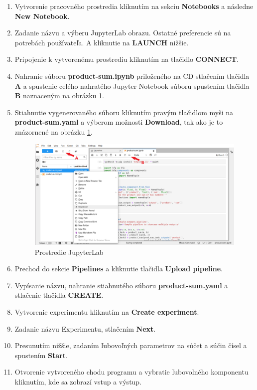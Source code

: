 \begin{enumerate}
\item Vytvorenie pracovného prostredia kliknutím na sekciu \textbf{Notebooks} a následne \textbf{New Notebook}.
\item Zadanie názvu a výberu JupyterLab obrazu. Ostatné preferencie sú na potrebách používateľa. A kliknutie na \textbf{LAUNCH} nižšie.
\item Pripojenie k vytvorenému prostrediu kliknutím na tlačidlo \textbf{CONNECT}.
\item Nahranie súboru \textbf{product-sum.ipynb} priloženého na CD stlačením tlačidla \textbf{A} a spustenie celého nahratého Jupyter Notebook súboru spustením tlačidla \textbf{B} naznaceným na obrázku \ref{tu}.
\item {Stiahnutie vygenerovaného súboru kliknutím pravým tlačidlom myši na \textbf{product-sum.yaml} a výberom možnosti \textbf{Download}, tak ako je to znázornené na obrázku \ref{tu}.
\begin{figure}[!h]
    \centering
    \includegraphics[width=1\linewidth]{figures/4.png}
    \caption{Prostredie JupyterLab}
    \label{tu}
\end{figure}}
\item Prechod do sekcie \textbf{Pipelines} a kliknutie tlačidla \textbf{Upload pipeline}.
\item Vypísanie názvu, nahranie stiahnutého súboru \textbf{product-sum.yaml} a stlačenie tlačidla \textbf{CREATE}.
\item Vytvorenie experimentu kliknutím na \textbf{Create experiment}.
\item Zadanie názvu Experimentu, stlačením \textbf{Next}.
\item Presunutím nižšie, zadaním ľubovoľných parametrov na súčet a súčin čísel a spustením \textbf{Start}.
\item Otvorenie vytvoreného chodu programu a vybratie ľubovoľného komponentu kliknutím, kde sa zobrazí vstup a výstup.
\end{enumerate}